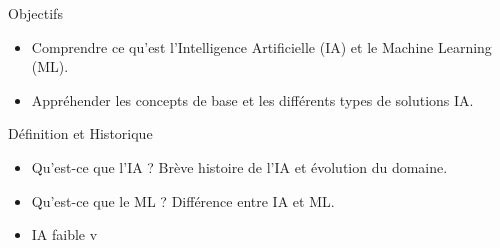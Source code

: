 
\begin{frame}{Objectifs}
  \begin{itemize}
  \item Comprendre ce qu'est l'Intelligence Artificielle (IA) et le Machine Learning (ML).
  \item Appréhender les concepts de base et les différents types de solutions IA.
  \end{itemize}
\end{frame}

\begin{frame}{Définition et Historique}
  \begin{itemize}
  \item Qu'est-ce que l'IA ? Brève histoire de l'IA et évolution du domaine.
  \item Qu'est-ce que le ML ? Différence entre IA et
    ML. 
  \item IA faible v 
  \end{itemize}
\end{frame}

